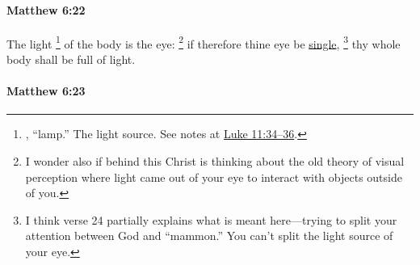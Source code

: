 		\paragraph{Matthew 6:22} %
			\label{MATTHEW-6-22}

			The light%
				\footnote{%
					\hyperref[LUCHNOS]{}, ``lamp.'' The light source. See notes at \hyperref[LUKE-11-34]{Luke 11:34--36}.
					} 
			of the body is the eye:%
				\footnote{%
					I wonder also if behind this Christ is thinking about the old theory of visual perception where light came out of your eye to interact with objects outside of you.
					}
			if therefore thine eye be \hyperref[SINGLE]{single},%
				\footnote{%
					I think verse 24 partially explains what is meant here---trying to split your attention between God and ``mammon.'' You can't split the light source of your eye.
					}
			thy whole body shall be full of light.

			\begin{framed}
			\scriptsize
				\begin{compactdesc}
					\item[SBLG]  \hyperref[LUCHNOS]{}  \hyperref[HAPLOUS]{}
				\end{compactdesc}
			\end{framed}

		\paragraph{Matthew 6:23} %
			\label{MATTHEW-6-23}

